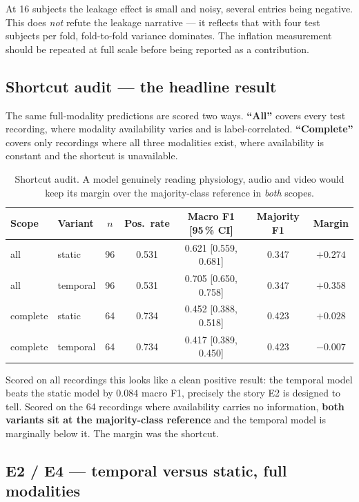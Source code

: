 \documentclass[11pt,a4paper]{article}
\newcommand{\alert}[1]{\textcolor{alertred}{\textbf{#1}}}
\begin{document}
\noindent
At 16 subjects the leakage effect is small and noisy, several entries being negative.
This does \emph{not} refute the leakage narrative --- it reflects that with four test
subjects per fold, fold-to-fold variance dominates. The inflation measurement should be
repeated at full scale before being reported as a contribution.

\subsection{Shortcut audit --- the headline result}\label{sec:shortcut}

The same full-modality predictions are scored two ways. \textbf{``All''} covers every test
recording, where modality availability varies and is label-correlated. \textbf{``Complete''}
covers only recordings where all three modalities exist, where availability is constant
and the shortcut is unavailable.

\begin{table}[h]\centering\small
\caption{Shortcut audit. A model genuinely reading physiology, audio and video would keep
its margin over the majority-class reference in \emph{both} scopes.}
\begin{tabular}{llccccc}
\toprule
Scope & Variant & $n$ & Pos.\ rate & Macro F1 [95\,\% CI] & Majority F1 & Margin \\
\midrule
all      & static   & 96 & 0.531 & 0.621 [0.559, 0.681] & 0.347 & $+0.274$ \\
all      & temporal & 96 & 0.531 & 0.705 [0.650, 0.758] & 0.347 & $+0.358$ \\
complete & static   & 64 & 0.734 & 0.452 [0.388, 0.518] & 0.423 & $+0.028$ \\
complete & temporal & 64 & 0.734 & 0.417 [0.389, 0.450] & 0.423 & \alert{$-0.007$} \\
\bottomrule
\end{tabular}
\end{table}

\noindent
Scored on all recordings this looks like a clean positive result: the temporal model beats
the static model by $0.084$ macro F1, precisely the story E2 is designed to tell. Scored
on the 64 recordings where availability carries no information, \alert{both variants sit
at the majority-class reference} and the temporal model is marginally below it. The
margin was the shortcut.

\subsection{E2 / E4 --- temporal versus static, full modalities}
\end{document}

